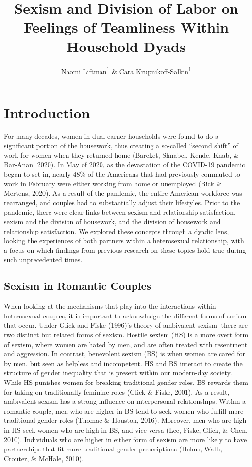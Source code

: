 \documentclass[
  man]{apa6}
\title{Sexism and Division of Labor on Feelings of Teamliness Within Household Dyads}
\author{Naomi Liftman\textsuperscript{1} \& Cara Krupnikoff-Salkin\textsuperscript{1}}
\date{}
\affiliation{\vspace{0.5cm}\textsuperscript{1} Smith College}
\begin{document}
\maketitle

\hypertarget{introduction}{%
\section{Introduction}\label{introduction}}

For many decades, women in dual-earner households were found to do a significant portion of the housework, thus creating a so-called ``second shift'' of work for women when they returned home (Bareket, Shnabel, Kende, Knab, \& Bar-Anan, 2020). In May of 2020, as the devastation of the COVID-19 pandemic began to set in, nearly 48\% of the Americans that had previously commuted to work in February were either working from home or unemployed (Bick \& Mertens, 2020). As a result of the pandemic, the entire American workforce was rearranged, and couples had to substantially adjust their lifestyles. Prior to the pandemic, there were clear links between sexism and relationship satisfaction, sexism and the division of housework, and the division of housework and relationship satisfaction. We explored these concepts through a dyadic lens, looking the experiences of both partners within a heterosexual relationship, with a focus on which findings from previous research on these topics hold true during such unprecedented times.

\hypertarget{sexism-in-romantic-couples}{%
\subsection{Sexism in Romantic Couples}\label{sexism-in-romantic-couples}}

When looking at the mechanisms that play into the interactions within heterosexual couples, it is important to acknowledge the different forms of sexism that occur. Under Glick and Fiske (1996)'s theory of ambivalent sexism, there are two distinct but related forms of sexism. Hostile sexism (HS) is a more overt form of sexism, where women are hated by men, and are often treated with resentment and aggression. In contrast, benevolent sexism (BS) is when women are cared for by men, but seen as helpless and incompetent. HS and BS interact to create the structure of gender inequality that is present within our modern-day society. While HS punishes women for breaking traditional gender roles, BS rewards them for taking on traditionally feminine roles (Glick \& Fiske, 2001). As a result, ambivalent sexism has a strong influence on interpersonal relationships. Within a romantic couple, men who are higher in BS tend to seek women who fulfill more traditional gender roles (Thomae \& Houston, 2016). Moreover, men who are high in HS seek women who are high in BS, and vice versa (Lee, Fiske, Glick, \& Chen, 2010). Individuals who are higher in either form of sexism are more likely to have partnerships that fit more traditional gender prescriptions (Helms, Walls, Crouter, \& McHale, 2010).
\end{document}
